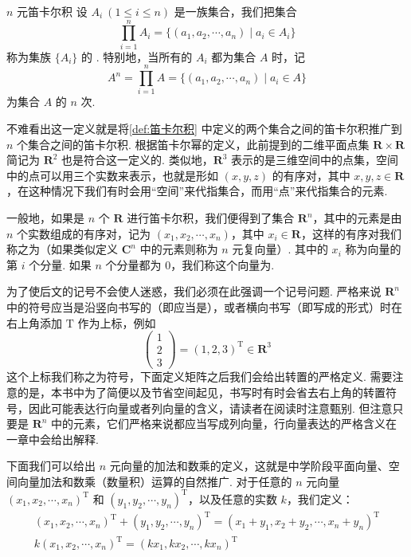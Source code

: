 \begin{definition}{$n$ 元笛卡尔积}{}
    设 $A_i~(1\leqslant i\leqslant n)$ 是一族集合，我们把集合
    \[
    \prod_{i=1}^n A_i = \{(a_1, a_2, \cdots, a_n) \mid a_i\in A_i\}
    \]
    称为集族 $\{A_i\}$ 的 . 特别地，当所有的 $A_i$ 都为集合 $A$ 时，记
    \[
    A^n = \prod_{i=1}^n A = \{(a_1, a_2, \cdots, a_n) \mid a_i \in A\}
    \]
    为集合 $A$ 的 $n$ 次.
\end{definition}

不难看出这一定义就是将\autoref{def:笛卡尔积} 中定义的两个集合之间的笛卡尔积推广到 $n$ 个集合之间的笛卡尔积. 根据笛卡尔幂的定义，此前提到的二维平面点集 $\mathbf{R} \times \mathbf{R}$ 简记为 $\mathbf{R}^2$ 也是符合这一定义的. 类似地，$\mathbf{R}^3$ 表示的是三维空间中的点集，空间中的点可以用三个实数来表示，也就是形如 $(x, y, z)$ 的有序对，其中 $x, y, z \in \mathbf{R}$，在这种情况下我们有时会用``空间''来代指集合，而用``点''来代指集合的元素.

一般地，如果是 $n$ 个 $\mathbf{R}$ 进行笛卡尔积，我们便得到了集合 $\mathbf{R}^n$，其中的元素是由 $n$ 个实数组成的有序对，记为 $(x_1, x_2, \cdots, x_n)$，其中 $x_i \in \mathbf{R}$，这样的有序对我们称之为（如果类似定义 $\mathbf{C}^n$ 中的元素则称为 $n$ 元复向量）. 其中的 $x_i$ 称为向量的第 $i$ 个分量. 如果 $n$ 个分量都为 $0$，我们称这个向量为.

为了使后文的记号不会使人迷惑，我们必须在此强调一个记号问题. 严格来说 $\mathbf{R}^n$ 中的符号应当是沿竖向书写的（即应当是），或者横向书写（即写成的形式）时在右上角添加 $\mathrm{T}$ 作为上标，例如
\[
\begin{pmatrix}
    1 \\ 2 \\ 3
\end{pmatrix} = (1, 2, 3)^{\mathrm{T}} \in \mathbf{R}^3
\]
这个上标我们称之为符号，下面定义矩阵之后我们会给出转置的严格定义. 需要注意的是，本书中为了简便以及节省空间起见，书写时有时会省去右上角的转置符号，因此可能表达行向量或者列向量的含义，请读者在阅读时注意甄别. 但注意只要是 $\mathbf{R}^n$ 中的元素，它们严格来说都应当写成列向量，行向量表达的严格含义在一章中会给出解释.

下面我们可以给出 $n$ 元向量的加法和数乘的定义，这就是中学阶段平面向量、空间向量加法和数乘（数量积）运算的自然推广. 对于任意的 $n$ 元向量 $(x_1, x_2, \cdots, x_n)^\mathrm{T}$ 和 $(y_1, y_2, \cdots, y_n)^\mathrm{T}$，以及任意的实数 $k$，我们定义：
\begin{gather*}
    (x_1, x_2, \cdots, x_n)^\mathrm{T} + (y_1, y_2, \cdots, y_n)^\mathrm{T} = (x_1+y_1, x_2+y_2, \cdots, x_n+y_n)^\mathrm{T} \\
    k(x_1, x_2, \cdots, x_n)^\mathrm{T} = (kx_1, kx_2, \cdots, kx_n)^\mathrm{T}
\end{gather*}

